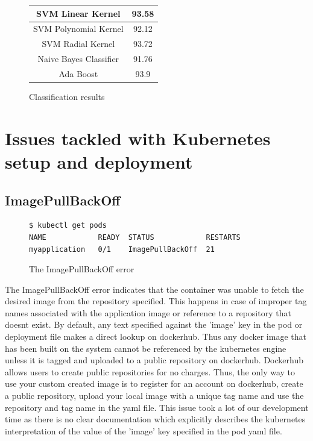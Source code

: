 \documentclass[9pt,twocolumn,twoside]{../../styles/osajnl}
\begin{document}
{\begin{figure}[ht]
\begin{center}
\begin{tabular}{|c | c|}
SVM Linear Kernel & 93.58 \\
\hline

SVM Polynomial Kernel & 92.12 \\
\hline

SVM Radial Kernel & 93.72 \\[1ex]
\hline

Naive Bayes Classifier & 91.76 \\[1ex]

\hline
Ada Boost  & 93.9 \\[1ex]
\hline

\end{tabular}
\end{center}
  \caption{Classification results}
\end{figure}


\section{Issues tackled with Kubernetes setup and deployment}

\subsection{ImagePullBackOff}

\begin{figure}[H]
\begin{verbatim}
$ kubectl get pods
NAME            READY  STATUS            RESTARTS  
myapplication   0/1    ImagePullBackOff  21         
\end{verbatim}
\caption{The ImagePullBackOff error}
\vspace{-3mm}
\label{The ImagePullBackOff error}
\end{figure}

The ImagePullBackOff error indicates that the container was unable to
fetch the desired image from the repository specified. This happens in
case of improper tag names associated with the application image or
reference to a repository that doesnt exist. By default, any text
specified against the 'image' key in the pod or deployment file makes
a direct lookup on dockerhub. Thus any docker image that has been
built on the system cannot be referenced by the kubernetes engine
unless it is tagged and uploaded to a public repository on
dockerhub. Dockerhub allows users to create public repositories for no
charges. Thus, the only way to use your custom created image is to
register for an account on dockerhub, create a public repository,
upload your local image with a unique tag name and use the repository
and tag name in the yaml file. This issue took a lot of our
development time as there is no clear documentation which explicitly
describes the kubernetes interpretation of the value of the 'image'
key specified in the pod yaml file.

}
\end{document}
